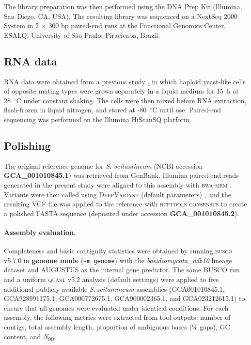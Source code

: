 \documentclass[Journal,letterpaper]{ascelike-new}
\begin{document}
The library preparation was then performed using the DNA Prep Kit (Illumina, San Diego, CA, USA). The resulting library was sequenced on a NextSeq 2000 System in 2 $\times$ 300 bp paired-end runs at the Functional Genomics Center, ESALQ, University of São Paulo, Piracicaba, Brazil.

\subsection*{RNA data}

RNA data were obtained from a previous study \cite{sscita2015}, in which haploid yeast-like cells of opposite mating types were grown separately in a liquid medium for 15~h at 28~$^{\circ}$C under constant shaking. The cells were then mixed before RNA extraction, flash-frozen in liquid nitrogen, and stored at -80~$^{\circ}$C until use. Paired-end sequencing was performed on the Illumina HiScanSQ platform.

\subsection*{Polishing}

The original reference genome for \textit{S. scitamineum} (NCBI accession \textbf{GCA\_001010845.1}) \cite{sscita2015} was retrieved from GenBank. Illumina paired-end reads generated in the present study were aligned to this assembly with \textsc{bwa-mem} \cite{bwamem}. Variants were then called using \textsc{DeepVariant} (default parameters) \cite{deepvariant2018}, and the resulting VCF file was applied to the reference with \textsc{bcftools consensus} \cite{samtools} to create a polished FASTA sequence (deposited under accession \textbf{GCA\_001010845.2}).

\paragraph{Assembly evaluation.} Completeness and basic contiguity statistics were obtained by running \textsc{busco} v5.7.0 \cite{busco} in \textbf{genome mode} (\texttt{-m genome}) with the \textit{basidiomycota\_odb10} lineage dataset and \textsc{AUGUSTUS} as the internal gene predictor. The same BUSCO run and a uniform \textsc{quast} v5.2 analysis (default settings) were applied to five additional publicly available \textit{S.\,scitamineum} assemblies (GCA001010845.1, GCA928991175.1, GCA000772675.1, GCA900002365.1, and GCA023212615.1) to ensure that all genomes were evaluated under identical conditions. For each assembly, the following metrics were extracted from tool outputs: number of contigs, total assembly length, proportion of ambiguous bases (\% gaps), GC content, and \textit{N}\textsubscript{90}.
\end{document}
